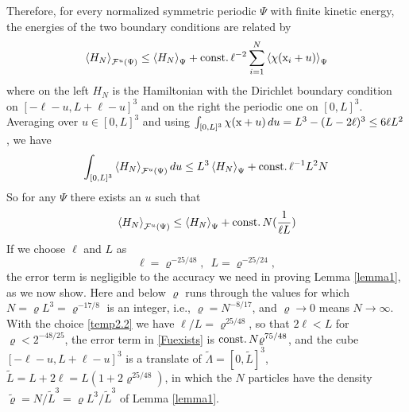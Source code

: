 \documentclass[11pt]{article}
\numberwithin{equation}{section}
\newcommand{\x}{{\rm x}}
\newcommand{\beq}{\begin{equation}}
\newcommand{\eeq}{\end{equation}}
\newcommand\const{{\rm const.\, }}
\renewcommand\rho\varrho
\theoremstyle{definition}
\begin{document}
Therefore,  for every normalized symmetric periodic $\Psi$ with finite kinetic energy, the energies of the two boundary conditions are related by
\beq
\left\langle H_N\right\rangle_{{\cal F}^u(\Psi)}\leq \left\langle H_N\right\rangle_{\Psi}+\const\ell^{-2}\sum_{i=1}^N\left\langle \chi (\x_i+u)\right\rangle_{\Psi}
\eeq
where on the left $H_N$ is the Hamiltonian with the Dirichlet boundary condition on $[-\ell-u,L+\ell-u]^3$ and on the right the periodic one on $[0,L]^3$.
Averaging over $u\in[0,L]^3$ and using $\int_{[0,L]^3}\chi(\x+u)\,du=L^3-(L-2\ell)^3\leq 6\ell L^2$, we have
\beq
\int_{[0,L]^3}\left\langle H_N\right\rangle_{{\cal F}^u(\Psi)}du
\leq L^3\left\langle H_N\right\rangle_{\Psi}+\const\ell^{-1}L^2N
\eeq
So for any $\Psi$ there exists an $u$ such that
\beq\label{Fuexists}
\left\langle H_N\right\rangle_{{\cal F}^u(\Psi)}\leq \left\langle H_N\right\rangle_{\Psi}+\const N(\frac{1}{\ell L})
\eeq
If we choose  $\ell$ and $L$ as
\beq\label{temp2.2}
\ell=\rho^{-25/48},\,\,\,  L=\rho^{-25/24},
\eeq
 the error term is negligible to the accuracy we need in proving  Lemma \ref{lemma1}, as we now show.
Here and below $\rho$ runs through the values for which $N=\rho L^3=\rho^{-17/8}$ is an integer, i.e., $\rho=N^{-8/17}$, and $\rho\to0$ means $N\to\infty$.
With the choice \eqref{temp2.2} we have $\ell/L=\rho^{25/48}$, so that $2\ell<L$ for $\rho<2^{-48/25}$, the error term in \eqref{Fuexists} is $\const N\rho^{75/48}$,
and the cube $[-\ell-u,L+\ell-u]^3$ is a translate of $\widetilde\Lambda=[0,\widetilde L]^3$, $\widetilde L=L+2\ell=L(1+2\rho^{25/48})$,
in which the $N$ particles have the density $\widetilde\rho=N/\widetilde L^3=\rho L^3/\widetilde L^3$ of Lemma \ref{lemma1}.
\end{document}
